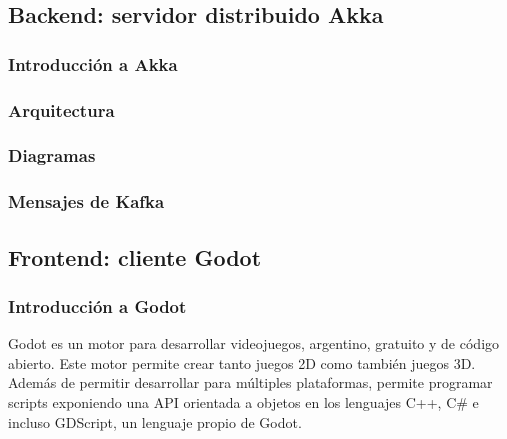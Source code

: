 

\subsection{Backend: servidor distribuido Akka}

\subsubsection{Introducción a Akka}

\subsubsection{Arquitectura}

\subsubsection{Diagramas}

\subsubsection{Mensajes de Kafka}


\subsection{Frontend: cliente Godot}

\subsubsection{Introducción a Godot}

Godot es un motor para desarrollar videojuegos, argentino, gratuito y de código abierto. Este motor permite crear tanto juegos 2D como también juegos 3D. Además de permitir desarrollar para múltiples plataformas, permite programar scripts exponiendo una API orientada a objetos en los lenguajes C++, C\# e incluso GDScript, un lenguaje propio de Godot.

